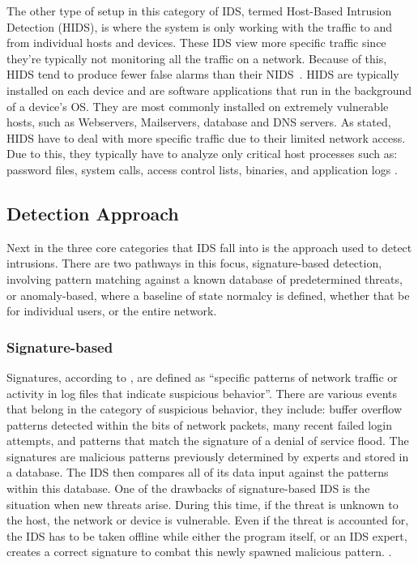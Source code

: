 \documentclass{umm-senior-sem}
\begin{document}
The other type of setup in this category of IDS, termed Host-Based Intrusion Detection (HIDS), is where the system is only working with the traffic to and from individual hosts and devices. These IDS view more specific traffic since they're typically not monitoring all the traffic on a network. Because of this, HIDS tend to produce fewer false alarms than their NIDS~\cite{NIDSandHIDS:2005}. 
HIDS are typically installed on each device and are software applications that run in the background of a device's OS. They are most commonly installed on extremely vulnerable hosts, such as Webservers, Mailservers, database and DNS servers. As stated, HIDS have to deal with more specific traffic due to their limited network access. Due to this, they typically have to analyze only critical host processes such as: password files, system calls, access control lists, binaries, and application logs
\cite{IDSoverview:2011}.

\subsection{Detection Approach}
Next in the three core categories that IDS fall into is the approach used to detect intrusions. There are two pathways in this focus, signature-based detection, involving pattern matching against a known database of predetermined threats, or anomaly-based, where a baseline of state normalcy is defined, whether that be for individual users, or the entire network. 
\subsubsection{Signature-based}
Signatures, according to \cite{IDSoverview:2011}, are defined as ``specific patterns of network traffic or activity in log files that indicate suspicious behavior''. There are various events that belong in the category of suspicious behavior, they include: buffer overflow 
patterns detected within the bits of network packets, many recent failed login attempts, and patterns that match the signature of a denial of service flood. The signatures are malicious patterns previously determined by experts and stored in a database. The IDS then compares all of its data input against the patterns within this database. One of the drawbacks of signature-based IDS is the situation when new threats arise. During this time, if the threat is unknown to the host, the network or device is vulnerable. Even if the threat is accounted for, the IDS has to be taken offline while either the program itself, or an IDS expert, creates a correct signature to combat this newly spawned malicious pattern. 
\cite{IDSoverview:2011}.
\end{document}
